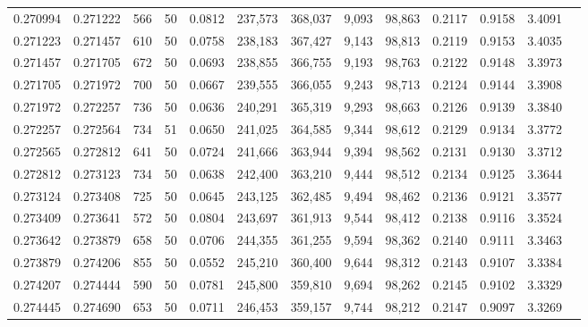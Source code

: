 \begin{tabular}{rrrrrrrrrrrrr}
0.270994 & 0.271222 &   566 &  50 &                                     0.0812 & 237,573 & 368,037 &   9,093 &  98,863 & 0.2117 & 0.9158 & 3.4091 \\
0.271223 & 0.271457 &   610 &  50 &                                     0.0758 & 238,183 & 367,427 &   9,143 &  98,813 & 0.2119 & 0.9153 & 3.4035 \\
0.271457 & 0.271705 &   672 &  50 &                                     0.0693 & 238,855 & 366,755 &   9,193 &  98,763 & 0.2122 & 0.9148 & 3.3973 \\
0.271705 & 0.271972 &   700 &  50 &                                     0.0667 & 239,555 & 366,055 &   9,243 &  98,713 & 0.2124 & 0.9144 & 3.3908 \\
0.271972 & 0.272257 &   736 &  50 &                                     0.0636 & 240,291 & 365,319 &   9,293 &  98,663 & 0.2126 & 0.9139 & 3.3840 \\
0.272257 & 0.272564 &   734 &  51 &                                     0.0650 & 241,025 & 364,585 &   9,344 &  98,612 & 0.2129 & 0.9134 & 3.3772 \\
0.272565 & 0.272812 &   641 &  50 &                                     0.0724 & 241,666 & 363,944 &   9,394 &  98,562 & 0.2131 & 0.9130 & 3.3712 \\
0.272812 & 0.273123 &   734 &  50 &                                     0.0638 & 242,400 & 363,210 &   9,444 &  98,512 & 0.2134 & 0.9125 & 3.3644 \\
0.273124 & 0.273408 &   725 &  50 &                                     0.0645 & 243,125 & 362,485 &   9,494 &  98,462 & 0.2136 & 0.9121 & 3.3577 \\
0.273409 & 0.273641 &   572 &  50 &                                     0.0804 & 243,697 & 361,913 &   9,544 &  98,412 & 0.2138 & 0.9116 & 3.3524 \\
0.273642 & 0.273879 &   658 &  50 &                                     0.0706 & 244,355 & 361,255 &   9,594 &  98,362 & 0.2140 & 0.9111 & 3.3463 \\
0.273879 & 0.274206 &   855 &  50 &                                     0.0552 & 245,210 & 360,400 &   9,644 &  98,312 & 0.2143 & 0.9107 & 3.3384 \\
0.274207 & 0.274444 &   590 &  50 &                                     0.0781 & 245,800 & 359,810 &   9,694 &  98,262 & 0.2145 & 0.9102 & 3.3329 \\
0.274445 & 0.274690 &   653 &  50 &                                     0.0711 & 246,453 & 359,157 &   9,744 &  98,212 & 0.2147 & 0.9097 & 3.3269 \\

\end{tabular}
